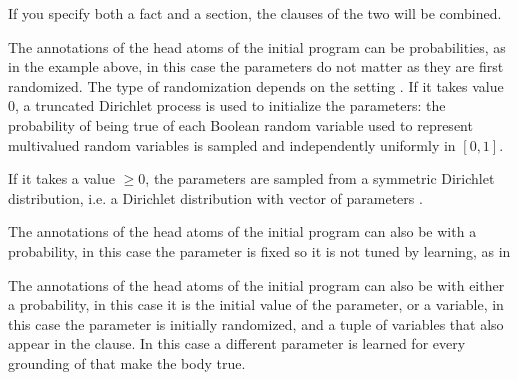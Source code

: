 \documentclass[letterpaper,10pt,english]{sphinxmanual}
\begin{document}
If you specify both a  fact and a section, the clauses of the two will be combined.

The annotations of the head atoms of the initial program can be probabilities, as in the example above, in this case the parameters do not matter as they are first randomized. The type of randomization depends on the setting .
If it takes value 0, a truncated Dirichlet process is used to initialize the parameters: the probability of being true of each Boolean random variable used to represent multivalued random variables is sampled and independently uniformly in \([0,1]\).

If it takes a value \(\geq 0\), the parameters are sampled from a symmetric Dirichlet distribution, i.e. a Dirichlet distribution with vector of parameters .

The annotations of the head atoms of the initial program can also be  with  a probability, in this case the parameter is fixed so it is not tuned by learning, as in

\begin{sphinxVerbatim}[commandchars=\\\{\}]
\PYG{p}{[} 
         
        \PYG{p}{]}
\end{sphinxVerbatim}

The annotations of the head atoms of the initial program can also be  with  either a probability, in this case it is the initial value of the parameter, or a variable, in this case the parameter is initially randomized, and  a tuple of variables that also appear in the clause.
In this case a different parameter is learned for every grounding of  that make the body true.
\end{document}

